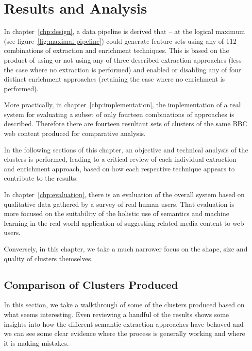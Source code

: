 \chapter{Results and Analysis}
\label{chp:analysis}

In chapter~\ref{chp:design}, a data pipeline is derived that -- at
the logical maximum (see figure~\ref{fig:maximal-pipeline}) could
generate feature sets using any of 112 combinations of extraction
and enrichment techniques. This is based on the product of using or
not using any of three described extraction approaches (less the case
where no extraction is performed) and enabled or disabling any of
four distinct enrichment approaches (retaining the case where no
enrichment is performed).

More practically, in chapter~\ref{chp:implementation}, the
implementation of a real system for evaluating a subset of only
fourteen combinations of approaches is described. Therefore there
are fourteen resultant sets of clusters of the same BBC web content
produced for comparative analysis.

In the following sections of this chapter, an objective and technical
analysis of the clusters is performed, leading to a critical review
of each individual extraction and enrichment approach, based on how
each respective technique appears to contribute to the results.

In chapter~\ref{chp:evaluation}, there is an evaluation of the
overall system based
on qualitative data gathered by a survey of real human users. That
evaluation is more focused on the suitability of the holistic use of
semantics and machine learning in the real world application of
suggesting related media content to web users.

Conversely, in this chapter, we take a much narrower focus on the
shape, size and quality of clusters themselves.

\section{Comparison of Clusters Produced}
\label{sec:anal-comparison}

In this section, we take a walkthrough of some of the clusters
produced based on what seems interesting. Even reviewing a handful
of the results shows some insights into how the different semantic
extraction approaches have behaved and we can see some clear
evidence where the process is generally working and where it is
making mistakes.


